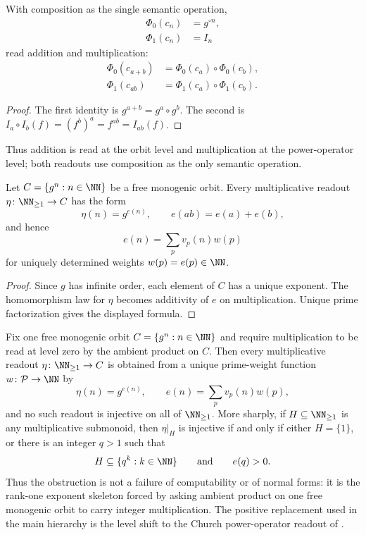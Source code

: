 \begin{theorem}
\label{thm:two-level}
With composition as the single semantic operation,
\begin{align}
  \Phi_0(c_n)&=g^{\circ n},\label{eq:level0}\\
  \Phi_1(c_n)&=I_n\label{eq:level1}
\end{align}
read addition and multiplication:
\begin{align}
  \Phi_0(c_{a+b})&=\Phi_0(c_a)\circ\Phi_0(c_b),\label{eq:add-from-comp}\\
  \Phi_1(c_{ab})&=\Phi_1(c_a)\circ\Phi_1(c_b).\label{eq:mul-from-comp}
\end{align}
\end{theorem}

\begin{proof}
The first identity is \(g^{a+b}=g^a\circ g^b\).  The second is
\(I_a\circ I_b(f)=(f^b)^a=f^{ab}=I_{ab}(f)\).
\end{proof}

Thus addition is read at the orbit level and multiplication at the power-operator
level; both readouts use composition as the only semantic operation.
\begin{lemma}
\label{lem:level-zero-exponent-skeleton}
Let \(C=\{g^n:n\in\NN\}\) be a free monogenic orbit.  Every multiplicative
readout \(\eta\colon\NN_{\ge1}\to C\) has the form
\[
  \eta(n)=g^{e(n)},
  \qquad e(ab)=e(a)+e(b),
\]
and hence
\[
  e(n)=\sum_{p}v_p(n)w(p)
\]
for uniquely determined weights \(w(p)=e(p)\in\NN\).
\end{lemma}

\begin{proof}
Since \(g
\) has infinite order, each element of \(C\) has a unique exponent.  The
homomorphism law for \(\eta\) becomes additivity of \(e\) on multiplication.
Unique prime factorization gives the displayed formula.
\end{proof}

\begin{theorem}
\label{thm:level-zero-obstruction}
Fix one free monogenic orbit \(C=\{g^n:n\in\NN\}\) and require multiplication to
be read at level zero by the ambient product on \(C\).  Then every
multiplicative readout \(\eta\colon\NN_{\ge1}\to C\) is obtained from a unique
prime-weight function \(w\colon\mathcal P\to\NN\) by
\[
  \eta(n)=g^{e(n)},
  \qquad e(n)=\sum_p v_p(n)w(p),
\]
and no such readout is injective on all of \(\NN_{\ge1}\).  More sharply, if
\(H\subseteq\NN_{\ge1}\) is any multiplicative submonoid, then
\(\eta|_H\) is injective if and only if either \(H=\{1\}\), or there is an
integer \(q>1\) such that
\[
  H\subseteq\{q^k:k\in\NN\}
  \qquad\hbox{and}\qquad e(q)>0.
\]
Thus the obstruction is not a failure of computability or of normal forms: it is
the rank-one exponent skeleton forced by asking ambient product on one free
monogenic orbit to carry integer multiplication.  The positive replacement used
in the main hierarchy is the level shift to the Church power-operator readout of
.
\end{theorem}

